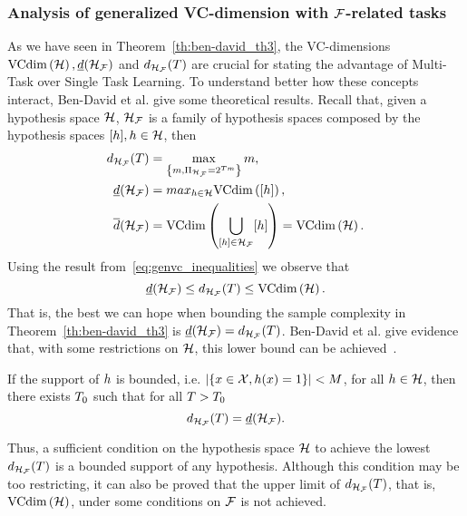 \subsubsection*{Analysis of generalized VC-dimension with $\mathcal{F}$-related tasks}
As we have seen in Theorem~\ref{th:ben-david_th3}, the VC-dimensions $\text{VCdim}\left(\mathcal{H}\right), \underline{d}(\mathcal{H}_{\mathcal{F}})$ and $d_{\mathcal{H}_{\mathcal{F}}}(T)$ are crucial for stating the advantage of Multi-Task over Single Task Learning. 
To understand better how these concepts interact, Ben-David et al. give some theoretical results.
Recall that, given a hypothesis space $\mathcal{H}$, $\mathcal{H}_{\mathcal{F}}$ is a family of hypothesis spaces composed by the hypothesis spaces $\lbrack h\rbrack, h \in \mathcal{H}$, then
\begin{align*}
    \nonumber
    d_{\mathcal{H}_{\mathcal{F}}}(T) &= \max_{\left\{m ,\Pi_{\mathcal{H}_{\mathcal{F}}} = 2^{T m}\right\} } m, \\
    \underline{d}(\mathcal{H}_{\mathcal{F}}) &= max_{h \in \mathcal{H}} \text{VCdim}\left(\lbrack h\rbrack\right), \\    
    \overline{d}(\mathcal{H}_{\mathcal{F}}) &= \text{VCdim}\left(\bigcup_{\lbrack h\rbrack \in \mathcal{H}_{\mathcal{F}}} \lbrack h\rbrack\right)= \text{VCdim}\left(\mathcal{H}\right).
\end{align*}
Using the result from~\eqref{eq:genvc_inequalities} we observe that
\begin{equation}
    \nonumber
    \underline{d}(\mathcal{H}_{\mathcal{F}}) \leq d_{\mathcal{H}_{\mathcal{F}}}(T) \leq \text{VCdim}\left(\mathcal{H}\right) .
\end{equation}
That is, the best we can hope when bounding the sample complexity in Theorem~\ref{th:ben-david_th3} is $\underline{d}(\mathcal{H}_{\mathcal{F}}) = d_{\mathcal{H}_{\mathcal{F}}}(T)$. 
Ben-David et al. give evidence that, with some restrictions on $\mathcal{H}$, this lower bound can be achieved~\cite[Theorem~4]{Ben-DavidB08}.
\begin{theorem}
    If the support of $h$ is bounded, i.e. $ \left|\left\{x \in \mathcal{X},  h(x) = 1\right\}\right| < M$, for all $h \in \mathcal{H}$, then there exists $T_0$ such that for all $T>T_0$
    \begin{equation}
        \nonumber
        d_{\mathcal{H}_{\mathcal{F}}}(T) = \underline{d}(\mathcal{H}_{\mathcal{F}}).
    \end{equation} 
\end{theorem}
Thus, a sufficient condition on the hypothesis space $\mathcal{H}$ to achieve the lowest $d_{\mathcal{H}_{\mathcal{F}}}(T)$ is a bounded support of any hypothesis. Although this condition may be too restricting, it can also be proved that the upper limit of $d_{\mathcal{H}_{\mathcal{F}}}(T)$, that is, $\text{VCdim}\left(\mathcal{H}\right)$, under some conditions on $\mathcal{F}$ is not achieved. 

